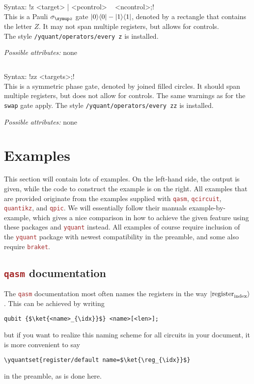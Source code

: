 \documentclass{scrartcl}
\makeatletter
\def\pkg#1{\textcolor{brown}{\texttt{#1}}}
\def\ttlink{\link\texttt}
\def\Yquant{\pkg{yquant}}
\def\ketbra#1#2{\ket{#1}\!\bra{#2}}
\newcommand*{\the@orig@section}{}
\let\the@orig@section=\section
\renewcommand*{\section}{%
   \clearpage%
   \the@orig@section%
}
\makeatother
\begin{document}
      \subsection{\texorpdfstring{}{z}}
         Syntax: \yquant!z <target> | <pcontrol> ~ <ncontrol>;! \\
         This is a Pauli $\sigma_{\symup z}$ gate $\ketbra00 - \ketbra11$, denoted by a rectangle that contains the letter $Z$.
         It may not span multiple registers, but allows for controls. \\
         The style \ttlink{/yquant/operators/every z} is installed.

         \emph{Possible attributes:} none

      \subsection{\texorpdfstring{}{zz}}
         Syntax: \yquant!zz <targets>;! \\
         This is a symmetric phase gate, denoted by joined filled circles.
         It should span multiple registers, but does not allow for controls.
         The same warnings as for the \ttlink{swap} gate apply.
         The style \ttlink{/yquant/operators/every zz} is installed.

         \emph{Possible attributes:} none


   \section{Examples}\label{sec:examples}
      This section will contain lots of examples.
      On the left\hyp hand side, the output is given, while the code to construct the example is on the right.
      All examples that are provided originate from the examples supplied with \pkg{qasm}, \pkg{qcircuit}, \pkg{quantikz}, and \pkg{qpic}.
      We will essentially follow their manuals example\hyp by\hyp example, which gives a nice comparison in how to achieve the given feature using these packages and \Yquant{} instead.
      All examples of course require inclusion of the \Yquant{} package with newest compatibility in the preamble, and some also require \pkg{braket}.

      \subsection{\pkg{qasm} documentation}
      \begingroup%
         The \pkg{qasm} documentation most often names the registers in the way $\ket{\mathrm{register}_{\mathrm{index}}}$.
         This can be achieved by writing
         \begin{verbatim}
qubit {$\ket{<name>_{\idx}}$} <name>[<len>];
         \end{verbatim}
         but if you want to realize this naming scheme for all circuits in your document, it is more convenient to say
         \begin{verbatim}
\yquantset{register/default name=$\ket{\reg_{\idx}}$}
         \end{verbatim}
         in the preamble, as is done here.
\end{document}
